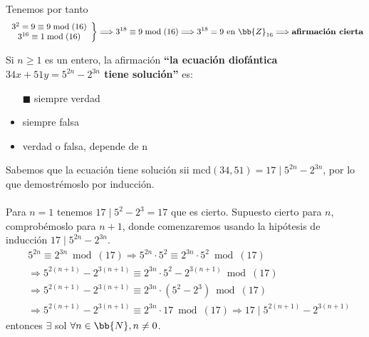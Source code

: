 \documentclass[12pt]{article}
\begin{document}
\begin{ejercicio}[1 punto]
\begin{equation*}
        \end{equation*}
        Tenemos por tanto
        \begin{equation*}
            \left.\begin{array}{c}
                3^2=9\equiv9\bmod{(16)}\\
                3^{16}\equiv1\bmod{(16)}
            \end{array} \right\} \Longrightarrow 3^{18}\equiv9\bmod{(16)}\Longrightarrow 3^{18}=9 \text{ en } \bb{Z}_{16}\Longrightarrow \textbf{afirmación cierta}
        \end{equation*}
    \end{ejercicio}

    \begin{ejercicio}[1 punto]
        Si $n\geq 1$ es un entero, la afirmación \textbf{``la ecuación diofántica $34x+51y=5^{2n}-2^{3n}$ tiene solución''} es:
        \begin{itemize}[label=$\square$]
            \item [$\blacksquare$]siempre verdad
            \item siempre falsa
            \item verdad o falsa, depende de n
        \end{itemize}
        Sabemos que la ecuación tiene solución sii $\text{mcd}(34,51)=17 \mid 5^{2n}-2^{3n}$, por lo que demostrémoslo por inducción. \\ \\
        Para $n=1$ tenemos $17\mid 5^{2}-2^3=17$ que es cierto.
        Supuesto cierto para $n$, comprobémoslo para $n+1$, donde comenzaremos usando la hipótesis de inducción $ 17 \mid 5^{2n}-2^{3n}$.
        \begin{align*}
            &5^{2n}\equiv 2^{3n}\bmod(17)\Longrightarrow 5^{2n}\cdot 5^2\equiv 2^{3n}\cdot5^2\bmod(17) \\
            &\Longrightarrow 5^{2(n+1)}-2^ {3(n+1)}\equiv 2^{3n}\cdot5^2-2^ {3(n+1)}\bmod(17) \\
            &\Longrightarrow 5^{2(n+1)}-2^ {3(n+1)}\equiv 2^{3n}\cdot(5^2-2^3)\bmod(17) \\
            &\Longrightarrow 5^{2(n+1)}-2^ {3(n+1)}\equiv 2^{3n}\cdot17\bmod(17)\Longrightarrow 17\mid 5^{2(n+1)}-2^ {3(n+1)}
        \end{align*}
        entonces $\exists$ sol $\forall n\in \bb{N}, n\neq 0$.
    \end{ejercicio}
\end{document}
